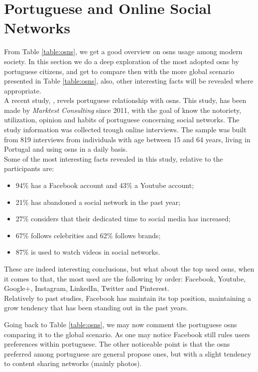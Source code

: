 \section{Portuguese and Online Social Networks}
From Table \ref{table:osns}, we get a good overview on \glspl{osn} usage among modern society. In this section we do a deep exploration of the most adopted \glspl{osn} by portuguese citizens,
and get to compare then with the more global scenario presented in Table \ref{table:osns}, also, other interesting facts will be revealed where appropriate.\\
\indent A recent study, \cite{marktest2016}, revels portuguese relationship with \glspl{osn}. This study, has been made by \textit{Marktest Consulting} since 2011, with the goal of know the notoriety, utilization, opinion
and habits of portuguese concerning social networks. The study information was collected trough online interviews. The sample was built from 819 interviews from individuals with age between
15 and 64 years, living in Portugal and using \glspl{osn} in a daily basis.\\
\indent Some of the most interesting facts revealed in this study, relative to the participants are:
\begin{itemize}
  \item 94\% has a Facebook account and 43\% a Youtube account;
  \item 21\% has abandoned a social network in the past year;
  \item 27\% considers that their dedicated time to social media has increased;
  \item 67\% follows celebrities and 62\% follows brands;
  \item 87\% is used to watch videos in social networks.
\end{itemize}

\indent These are indeed interesting conclusions, but what about the top used \glspl{osn}, when it comes to that, the most used are
the following by order: Facebook, Youtube, Google+, Instagram, LinkedIn, Twitter and Pinterest.\\
\indent Relatively to \cite{marktest2016} past studies, Facebook has maintain
its top position, maintaining a grow tendency that has been standing out in the past years.

\indent Going back to Table \ref{table:osns}, we may now comment the portuguese \glspl{osn} comparing it
to the global scenario. As one may notice Facebook still rules users preferences within portuguese.
The other noticeable point is that the \glspl{osn} preferred among portuguese are general propose ones,
but with a slight tendency to content sharing networks (mainly photos).

